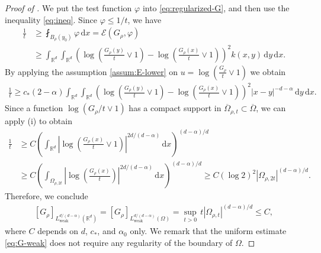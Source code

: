 \documentclass[reqno]{amsart}
\theoremstyle{plain}
\theoremstyle{definition}
\numberwithin{equation}{section}
\newcommand{\Rd}{\mathbb{R}^d}
\newcommand{\dx} {\, \mathrm{d}x}
\newcommand{\dy} {\, \mathrm{d}y}
\newcommand{\cl} {c_{\ast}}
\begin{document}
\begin{proof} [Proof of ]
We put the test function $\varphi$ into \eqref{eq:regularized-G}, and then 
use the inequality \eqref{eq:ineq}. Since $\varphi \leq 1/t$, we have
\begin{align*}
\frac{1}{t} 
&\geq \fint_{B_{\rho}(y_{0})} \varphi \dx
= \mathcal{E}(G_{\rho}, \varphi) \\
&\geq \int_{\Rd} \int_{\Rd} \left( \log \left( \frac{G_{\rho}(y)}{t} \lor 1 \right) 
- \log \left( \frac{G_{\rho}(x)}{t} \lor 1 \right) \right)^2 k(x,y) \dy \dx.
\end{align*}
By applying the assumption \eqref{assum:E-lower} on $u = \log( \frac{G_{\rho}}{t} \lor 1)$ we obtain
\begin{align*}
\frac{1}{t} 
\geq \cl (2-\alpha) \int_{\Rd} \int_{\Rd} \left( \log \left( \frac{G_{\rho}(y)}{t} \lor 1 \right) 
- \log \left( \frac{G_{\rho}(x)}{t} \lor 1 \right) \right)^2 |x-y|^{-d-\alpha} \dy \dx.
\end{align*}
Since a function $\log(G_{\rho}/t \lor 1)$ has a compact support in $\overline{\Omega}_{\rho, t}
\subset \overline{\Omega}$, we can apply  (i) to obtain
\begin{align*}
\frac{1}{t} 
&\geq C \left( \int_{\Rd} \left| \log \left( \frac{G_{\rho}(x)}{t} \lor 1 \right)
\right|^{2d/(d-\alpha)} \dx \right)^{(d-\alpha)/d} \\ 
&\geq C \left( \int_{\Omega_{\rho, 2t}} \left| \log \left( \frac{G_{\rho}(x)}{t}
\right) \right|^{2d/(d-\alpha)} \dx \right)^{(d-\alpha)/d}
\geq C (\log 2)^2 | \Omega_{\rho, 2t} |^{(d-\alpha)/d}.
\end{align*}
Therefore, we conclude
\begin{align} \label{eq:G-weak}
[G_{\rho}]_{L^{d/(d-\alpha)}_\mathrm{weak}(\Rd)} = [G_{\rho}]_{L^{d/(d-\alpha)}_\mathrm{weak}(\Omega)}
= \sup_{t > 0} \, t | \Omega_{\rho, t} |^{(d-\alpha)/d} \leq C,
\end{align}
where $C$ depends on $d$, $\cl$, and $\alpha_0$ only. We remark that the uniform estimate \eqref{eq:G-weak} does not require any regularity of the boundary of $\Omega$.


\end{proof}
\end{document}
